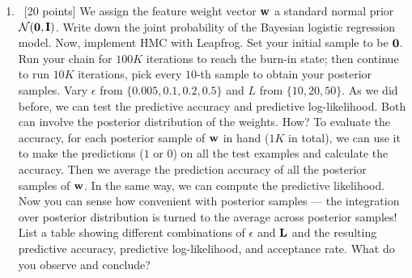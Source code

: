 \documentclass[12pt, fullpage,letterpaper]{article}
\begin{document}
\begin{enumerate}
	\begin{enumerate}
		\item~[20 points] We assign the feature weight vector ${\bf w}$ a standard normal prior $\mathcal{N}({\bf 0}, {\bf I})$. Write down the joint probability of the Bayesian logistic regression model. Now, implement HMC with Leapfrog. Set your initial sample to be ${\bf 0}$. Run your chain for $100K$ iterations to reach the burn-in state; then continue to run $10K$ iterations, pick every $10$-th sample to obtain your posterior samples. Vary $\epsilon$ from $\{0.005, 0.1, 0.2, 0.5\}$ and $L$ from $\{10, 20, 50\}$. As we did before, we can test the predictive accuracy and predictive log-likelihood. Both can involve the posterior distribution of the weights. How? To evaluate the accuracy, for each posterior sample of ${\bf w}$ in hand ($1K$ in total), we can use it to make the predictions ($1$ or $0$) on all the test examples and calculate the accuracy. Then we average the prediction accuracy of all the posterior  samples of ${\bf w}$. In the same way, we can compute the predictive likelihood. Now you can sense how convenient with posterior samples ---  the integration over posterior distribution is turned to the average across posterior samples! List a table showing different combinations of $\epsilon$ and ${\bf L}$ and the resulting predictive accuracy, predictive log-likelihood, and acceptance rate.  What do you observe and conclude?
		

\end{enumerate}
\end{enumerate}
\end{document}
